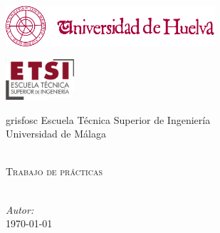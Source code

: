 \begin{titlepage}
\begin{center}

\begin{minipage}{0.49\linewidth}
\begin{flushleft}
\includegraphics[height=1.5cm]{./images/logo_uhu}
\end{flushleft}
\end{minipage}
\begin{minipage}{0.49\linewidth}
\begin{flushright}
\includegraphics[height=1.5cm]{./images/logo_etsi}
\end{flushright}
\end{minipage}

\vspace{2cm}

\begin{color}{grisfosc}
\large
Escuela Técnica Superior de Ingeniería\\[0.2cm]
Universidad de Málaga\\[1.9cm]
\end{color}

{\LARGE \bfseries \titulo}\\[1.5cm]
\textsc{\large Trabajo de prácticas}\\[0.4cm]
\textcolor{grisclar}{\large\titulacion}\\[5.0cm]

\begin{flushright} \large
\emph{Autor:} \autor\\[0.4cm]
\today
\end{flushright}


\end{center}

\end{titlepage}
